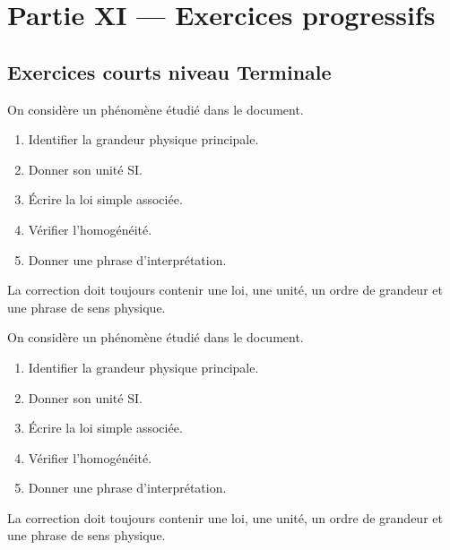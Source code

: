 \documentclass[11pt,a4paper]{article}
\begin{document}
\section{Partie XI — Exercices progressifs}

\subsection{Exercices courts niveau Terminale}

\begin{exercicebox}
On considère un phénomène étudié dans le document. 
\begin{enumerate}
  \item Identifier la grandeur physique principale.
  \item Donner son unité SI.
  \item Écrire la loi simple associée.
  \item Vérifier l'homogénéité.
  \item Donner une phrase d'interprétation.
\end{enumerate}
\end{exercicebox}

\begin{corrigebox}[Indication 1]
La correction doit toujours contenir une loi, une unité, un ordre de grandeur et une phrase de sens physique.
\end{corrigebox}

\begin{exercicebox}
On considère un phénomène étudié dans le document. 
\begin{enumerate}
  \item Identifier la grandeur physique principale.
  \item Donner son unité SI.
  \item Écrire la loi simple associée.
  \item Vérifier l'homogénéité.
  \item Donner une phrase d'interprétation.
\end{enumerate}
\end{exercicebox}

\begin{corrigebox}[Indication 2]
La correction doit toujours contenir une loi, une unité, un ordre de grandeur et une phrase de sens physique.
\end{corrigebox}
\end{document}

